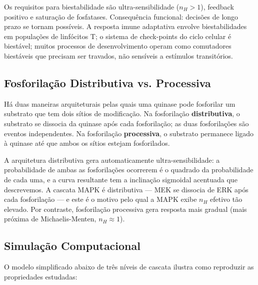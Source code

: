 Os requisitos para biestabilidade são ultra-sensibilidade ($n_H > 1$),
feedback positivo e saturação de fosfatases. Consequência funcional:
decisões de longo prazo se tornam possíveis. A resposta imune adaptativa
envolve biestabilidades em populações de linfócitos T; o sistema de check-points
do ciclo celular é biestável; muitos processos de desenvolvimento
operam como comutadores biestáveis que precisam ser travados, não sensíveis a
estímulos transitórios.

\subsection{Fosforilação Distributiva vs. Processiva}
\label{sub:image9-distributiva}

Há duas maneiras arquiteturais pelas quais uma quinase pode fosforilar um
substrato que tem dois sítios de modificação. Na fosforilação \textbf{distributiva}, o substrato se dissocia da quinase após cada fosforilação; as duas fosforilações
são eventos independentes. Na fosforilação \textbf{processiva}, o substrato
permanece ligado à quinase até que ambos os sítios estejam fosforilados.

A arquitetura distributiva gera automaticamente ultra-sensibilidade: a
probabilidade de ambas as fosforilações ocorrerem é o quadrado da probabilidade
de cada uma, e a curva resultante tem a inclinação sigmoidal acentuada que
descrevemos. A cascata MAPK é distributiva --- MEK se dissocia de ERK após
cada fosforilação --- e este é o motivo pelo qual a MAPK exibe $n_H$ efetivo
tão elevado. Por contraste, fosforilação processiva gera resposta mais gradual
(mais próxima de Michaelis-Menten, $n_H \approx 1$).

\subsection{Simulação Computacional}
\label{sub:image9-simulacao}

O modelo simplificado abaixo de três níveis de cascata ilustra como reproduzir
as propriedades estudadas:

